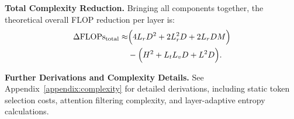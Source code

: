 \noindent
\textbf{Total Complexity Reduction.} 
Bringing all components together, the theoretical overall FLOP reduction per layer is:
\begin{equation}
\label{eq:final_theoretical_gain}
\begin{aligned}
\Delta \text{FLOPs}_{\text{total}} 
\approx & \Bigl( 4 L_r D^2 + 2 L_r^2 D + 2 L_r D M \Bigr) \\
& - \Bigl( H^2 + L_t L_v D + L^2 D \Bigr).
\end{aligned}
\end{equation}


\smallskip
\noindent
\textbf{Further Derivations and Complexity Details.} 
See Appendix~\ref{appendix:complexity} for detailed derivations, including static token selection costs, attention filtering complexity, and layer-adaptive entropy calculations.

